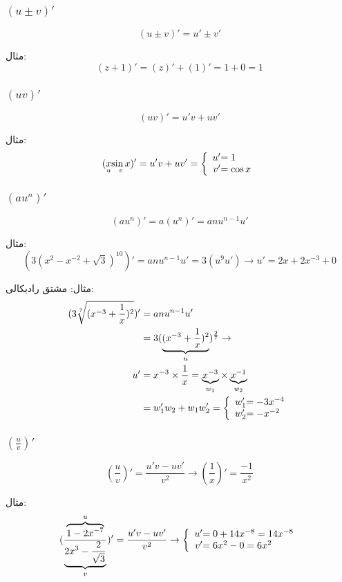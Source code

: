 \subsubsection{$(u \pm v)'$}
\[ (u \pm v)' = u' \pm v' \]

مثال:
\[ (z + 1)' = (z)' + (1)' = 1 + 0 = 1 \]

\subsubsection{$(uv)'$}
\[ (uv)' = u'v + uv' \]

مثال:
\begin{align*}
(\underset{u}{x}\underset{v}{\sin x})' = u'v + uv' = 
\left\lbrace
\begin{array}{r@{}l}
	u' &= 1 \\
	v' &= \cos x
\end{array}
\right.
\end{align*}

\subsubsection{$(au^n)'$}
\[ (au^n)' = a(u^n)' = anu^{n-1}u' \]

مثال:
\[ (3(x^2-x^{-2}+\sqrt{3})^{10})' = anu^{n-1}u' = 3(u^9u') \to u' = 2x +2x^{-3} + 0 \]

مثال: مشتق رادیکالی:
\begin{align*}
(3\sqrt[7]{(x^{-3}+\frac{1}{x})^2})' &= anu^{n-1}u' \\
&= 3(\underbrace{(x^{-3}+\frac{1}{x})^2}_u)^{\frac{2}{7}} \to \\
u' &= x^{-3}\times\frac{1}{x} =
\underbrace{x^{-3}}_{w_1} \times \underbrace{x^{-1}}_{w_2} \\
&= w_1'w_2+w_1w_2' = 
\left\lbrace
\begin{array}{r@{}l}
	w_1' &= -3x^{-4} \\
	w_2' &= -x^{-2}
\end{array}
\right.
\end{align*}

\subsubsection{$(\frac{u}{v})'$}
\[ (\frac{u}{v})' = \frac{u'v - uv'}{v^2} \to (\frac{1}{x})' = \frac{-1}{x^2} \]

مثال:
\begin{align*}
(\frac{\overbrace{1-2x^{-7}}^u}{\underbrace{2x^3-\frac{2}{\sqrt{3}}}_v})' = \frac{u'v - uv'}{v^2} \to
\left\lbrace
\begin{array}{r@{}l}
	u' &= 0 + 14x^{-8} = 14x^{-8} \\
	v' &= 6x^2-0 = 6x^2
\end{array}
\right.
\end{align*}

